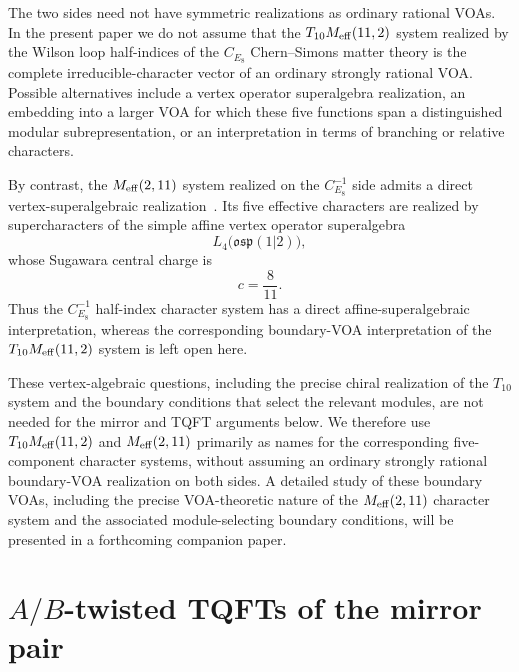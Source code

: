 \documentclass[11pt,a4paper]{article}
\numberwithin{equation}{section}
\begin{document}
The two sides need not have symmetric realizations as ordinary rational VOAs.  In the present paper we do not assume that the $T_{10}M_{\rm eff}(11,2)$ system realized by the Wilson loop half-indices of the $C_{E_8}$ Chern--Simons matter theory is the complete irreducible-character vector of an ordinary strongly rational VOA.  Possible alternatives include a vertex operator superalgebra realization, an embedding into a larger VOA for which these five functions span a distinguished modular subrepresentation, or an interpretation in terms of branching or relative characters.

By contrast, the $M_{\rm eff}(2,11)$ system realized on the $C_{E_8}^{-1}$ side admits a direct vertex-superalgebraic realization~\cite{LeeSun:2026MagicTriangle}.  Its five effective characters are realized by supercharacters of the simple affine vertex operator superalgebra
\begin{equation}
  L_4\bigl(\mathfrak{osp}(1|2)\bigr),
  \label{eq:osp12-boundary-VOA}
\end{equation}
whose Sugawara central charge is
\begin{equation}
  c=\frac{8}{11}.
  \label{eq:osp12-central-charge}
\end{equation}
Thus the $C_{E_8}^{-1}$ half-index character system has a direct affine-superalgebraic interpretation, whereas the corresponding boundary-VOA interpretation of the $T_{10}M_{\rm eff}(11,2)$ system is left open here.

These vertex-algebraic questions, including the precise chiral realization of the $T_{10}$ system and the boundary conditions that select the relevant modules, are not needed for the mirror and TQFT arguments below.  We therefore use $T_{10}M_{\rm eff}(11,2)$ and $M_{\rm eff}(2,11)$ primarily as names for the corresponding five-component character systems, without assuming an ordinary strongly rational boundary-VOA realization on both sides.  A detailed study of these boundary VOAs, including the precise VOA-theoretic nature of the $M_{\rm eff}(2,11)$ character system and the associated module-selecting boundary conditions, will be presented in a forthcoming companion paper.

\section{$A/B$-twisted TQFTs of the mirror pair}
\label{sec:AB-twisted-TQFTs}
\end{document}
